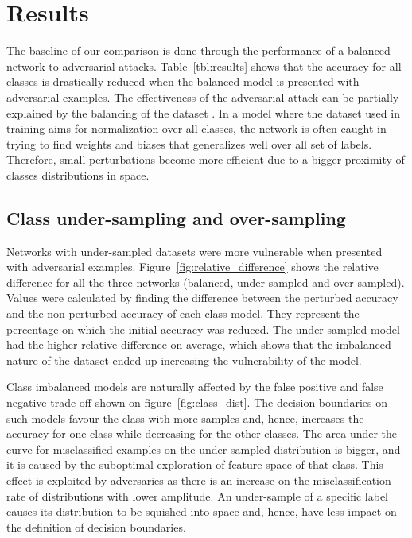 \documentclass[runningheads,a4paper]{llncs}
\begin{document}
\section{Results}
The baseline of our comparison is done through the performance of a balanced network to adversarial attacks. Table~\ref{tbl:results} shows that the accuracy for all classes is drastically reduced when the balanced model is presented with adversarial examples. The effectiveness of the adversarial attack can be partially explained by the balancing of the dataset . In a model where the dataset used in training aims for normalization over all classes, the network is often caught in trying to find weights and biases that generalizes well over all set of labels. Therefore, small perturbations become more efficient due to a bigger proximity of classes distributions in space.


\subsection{Class under-sampling and over-sampling}



Networks with under-sampled datasets were more vulnerable when presented with adversarial examples. Figure~\ref{fig:relative_difference} shows the relative difference for all the three networks (balanced, under-sampled and over-sampled). Values were calculated by finding the difference between the perturbed accuracy and the non-perturbed accuracy of each class model. They represent the percentage on which the initial accuracy was reduced. The under-sampled model had the higher relative difference on average, which shows that the imbalanced nature of the dataset ended-up increasing the vulnerability of the model.

Class imbalanced models are naturally affected by the false positive and false negative trade off shown on figure~\ref{fig:class_dist}. The decision boundaries on such models favour the class with more samples and, hence, increases the accuracy for one class while decreasing for the other classes. The area under the curve for misclassified examples on the under-sampled distribution is bigger, and it is caused by the suboptimal exploration of feature space of that class. This effect is exploited by adversaries as there is an increase on the misclassification rate of distributions with lower amplitude. An under-sample of a specific label causes its distribution to be squished into space and, hence, have less impact on the definition of decision boundaries.
\end{document}
